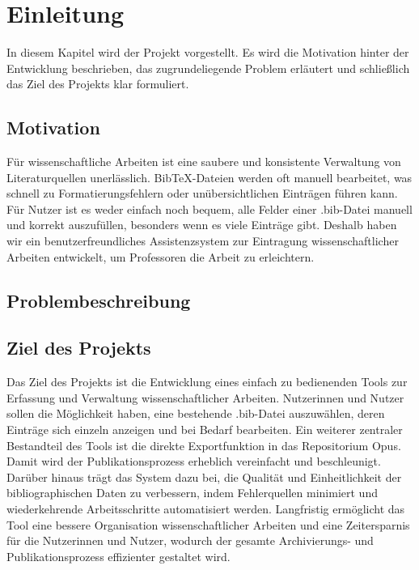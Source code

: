 \chapter{Einleitung}
In diesem Kapitel wird der Projekt vorgestellt. Es wird die Motivation 
hinter der Entwicklung beschrieben, das zugrundeliegende Problem erläutert
und schließlich das Ziel des Projekts klar formuliert. 

\section{Motivation}
Für wissenschaftliche Arbeiten ist eine saubere und konsistente Verwaltung 
von Literaturquellen unerlässlich. BibTeX-Dateien werden oft manuell 
bearbeitet, was schnell zu Formatierungsfehlern oder unübersichtlichen 
Einträgen führen kann. Für Nutzer ist es weder einfach noch bequem, 
alle Felder einer .bib-Datei manuell und korrekt auszufüllen, besonders 
wenn es viele Einträge gibt. Deshalb haben wir ein benutzerfreundliches 
Assistenzsystem zur Eintragung wissenschaftlicher Arbeiten entwickelt, 
um Professoren die Arbeit zu erleichtern.

\section{Problembeschreibung}


\section{Ziel des Projekts}
Das Ziel des Projekts ist die Entwicklung eines einfach zu bedienenden 
Tools zur Erfassung und Verwaltung wissenschaftlicher Arbeiten. 
Nutzerinnen und Nutzer sollen die Möglichkeit haben, eine bestehende 
.bib-Datei auszuwählen, deren Einträge sich einzeln anzeigen und bei 
Bedarf bearbeiten. Ein weiterer zentraler Bestandteil des Tools ist die direkte Exportfunktion
in das Repositorium Opus. Damit wird der Publikationsprozess erheblich 
vereinfacht und beschleunigt. Darüber hinaus trägt das System dazu bei, 
die Qualität und Einheitlichkeit der bibliographischen Daten zu verbessern,
indem Fehlerquellen minimiert und wiederkehrende Arbeitsschritte 
automatisiert werden. Langfristig ermöglicht das Tool eine bessere Organisation 
wissenschaftlicher Arbeiten und eine Zeitersparnis für die 
Nutzerinnen und Nutzer, wodurch der gesamte Archivierungs- 
und Publikationsprozess effizienter gestaltet wird.

